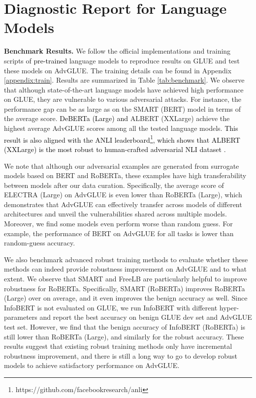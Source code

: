\documentclass{article}
\newcommand{\method}{AdvGLUE\xspace}
\newcommand{\m}[1]{{\textcolor{black}{{#1}}}}
\begin{document}
\section{Diagnostic Report for Language Models}


\textbf{Benchmark Results.}
We follow the official implementations and training scripts of \m{pre-trained} language models to reproduce results on GLUE and test these models on AdvGLUE. The training details can be found in Appendix \ref{appendix:train}.
Results are summarized in Table \ref{tab:benchmark}. We observe that although state-of-the-art language models have achieved high performance on GLUE, they are vulnerable to various adversarial attacks. For instance, the performance gap can be as large as  on the SMART (BERT) model in terms of the average score. 
\m{DeBERTa (Large) and} ALBERT (XXLarge) achieve the highest average \method scores among all the tested language models. \m{This result is also aligned with the ANLI leaderboard\footnote{https://github.com/facebookresearch/anli}, which shows that ALBERT (XXLarge) is the most robust to human-crafted adversarial NLI dataset \citep{anli}. }


We note that although our adversarial examples are generated from surrogate models based on BERT and RoBERTa, these examples have high transferability between models after our data curation. Specifically, the average score of ELECTRA (Large) on \method is even lower than RoBERTa (Large), which demonstrates that \method can effectively transfer across models of different architectures and unveil the vulnerabilities shared across multiple models. 
Moreover, we find  some models even perform worse than random guess. For example, the performance of BERT on \method for all tasks is lower than  random-guess accuracy. 

We also benchmark advanced robust training methods to evaluate whether these methods can indeed provide robustness improvement on \method and to what extent.
We observe that SMART and FreeLB are particularly helpful to improve  robustness for RoBERTa.
Specifically, SMART (RoBERTa) improves RoBERTa (Large) over  on average, and it even improves the benign accuracy as well. 
Since InfoBERT is not evaluated on GLUE, we run InfoBERT with different hyper-parameters and report the best accuracy on  benign GLUE dev set and \method test set. However, we find that the benign accuracy of InfoBERT (RoBERTa) is still lower than RoBERTa (Large), and similarly for the robust accuracy. 
These results suggest that existing robust training methods only have incremental robustness improvement, and there is still a long way to go to develop robust models to achieve satisfactory performance on \method.
\end{document}
